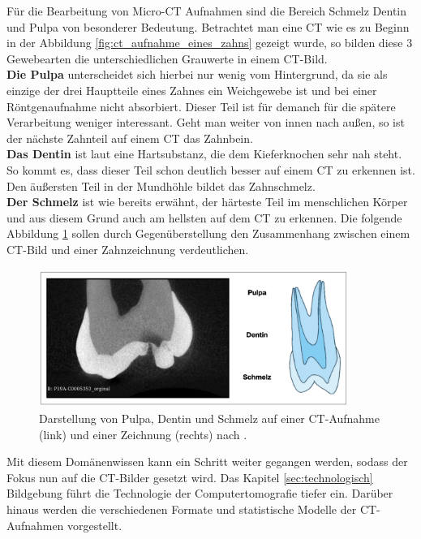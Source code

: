 Für die Bearbeitung von Micro-CT Aufnahmen sind die Bereich Schmelz Dentin und Pulpa
von besonderer Bedeutung. Betrachtet man eine CT wie es zu Beginn in der
Abbildung \ref{fig:ct_aufnahme_eines_zahns} gezeigt wurde, so bilden diese 3 Gewebearten
die unterschiedlichen Grauwerte in einem CT-Bild. \\ \textbf{Die Pulpa} unterscheidet
sich hierbei nur wenig vom Hintergrund, da sie als einzige der drei Hauptteile
eines Zahnes ein Weichgewebe ist und bei einer Röntgenaufnahme nicht absorbiert.
Dieser Teil ist für demanch für die spätere Verarbeitung weniger interessant.
Geht man weiter von innen nach außen, so ist der nächste Zahnteil auf einem CT das
Zahnbein. \\ \textbf{Das Dentin} ist laut \citet[Seite 41]{lehmann2012Zahnheilkunde}
eine Hartsubstanz, die dem Kieferknochen sehr nah steht. So kommt es, dass
dieser Teil schon deutlich besser auf einem CT zu erkennen ist. Den äußersten Teil
in der Mundhöhle bildet das Zahnschmelz. \\ \textbf{Der Schmelz} ist wie bereits
erwähnt, der härteste Teil im menschlichen Körper und aus diesem Grund auch am
hellsten auf dem CT zu erkennen. Die folgende Abbildung \ref{fig:pulpa_dentin_schmelz}
sollen durch Gegenüberstellung den Zusammenhang zwischen einem CT-Bild und einer
Zahnzeichnung verdeutlichen.

\begin{figure}[h]
	\centering
	\includegraphics[width=0.9\textwidth]{
		img/Bildschirmfoto 2024-11-22 um 15.13.24.jpg
	}
	\caption{Darstellung von Pulpa, Dentin und Schmelz auf einer CT-Aufnahme (link)
	und einer Zeichnung (rechts) nach \citet[Seite 29]{lehmann2012Zahnheilkunde}. }
	\label{fig:pulpa_dentin_schmelz}
\end{figure}

Mit diesem Domänenwissen kann ein Schritt weiter gegangen werden, sodass der Fokus
nun auf die CT-Bilder gesetzt wird. Das Kapitel \ref{sec:technologisch}
Bildgebung führt die Technologie der Computertomografie tiefer ein. Darüber hinaus
werden die verschiedenen Formate und statistische Modelle der CT-Aufnahmen vorgestellt.

